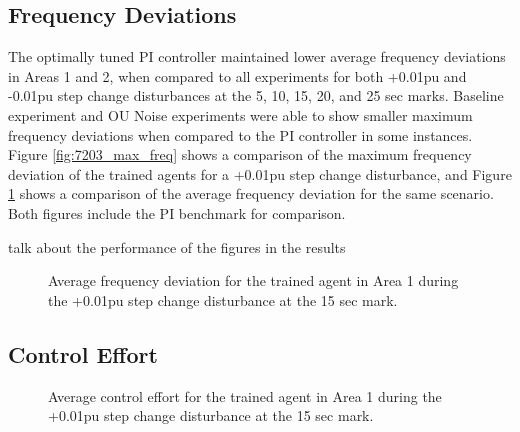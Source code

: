 \subsection{Frequency Deviations}
The optimally tuned PI controller maintained lower average frequency deviations in Areas 1 and 2, when compared to all experiments for both +0.01pu and -0.01pu step change disturbances at the 5, 10, 15, 20, and 25 sec marks. Baseline experiment and OU Noise experiments were able to show smaller maximum frequency deviations when compared to the PI controller in some instances. Figure \ref{fig:7203_max_freq} shows a comparison of the maximum frequency deviation of  the trained agents for a +0.01pu step change disturbance, and Figure \ref{fig:7204_avg_freq} shows a comparison of the average frequency deviation for the same scenario. Both figures include the PI benchmark for comparison.

talk about the performance of the figures in the results

\begin{figure}[h]
	\begin{minipage}[t]{0.50\textwidth}
		\centering
		\resizebox{7cm}{!}{}
		\caption{Maximum frequency deviation for the trained agent in Area 1 during the +0.01pu step change disturbance at the 15 sec mark.}\label{fig:7203_max_freq}
	\end{minipage}
	\hspace{0.25cm}
	\begin{minipage}[t]{0.50\textwidth}
		\resizebox{7cm}{!}{}
		\caption{Average frequency deviation for the trained agent in Area 1 during the +0.01pu step change disturbance at the 15 sec mark.}\label{fig:7204_avg_freq}
	\end{minipage}
\end{figure}

\clearpage

\subsection{Control Effort}

\begin{figure}[h]
	\begin{minipage}[t]{0.50\textwidth}
		\centering
		\resizebox{7cm}{!}{}
		\caption{Maximum control effort for the trained agent in Area 1 during the +0.01pu step change disturbance at the 15 sec mark.}
	\end{minipage}
	\hspace{0.25cm}
	\begin{minipage}[t]{0.50\textwidth}
		\resizebox{7cm}{!}{}
		\caption{Average control effort for the trained agent in Area 1 during the +0.01pu step change disturbance at the 15 sec mark.}
	\end{minipage}
\end{figure}

